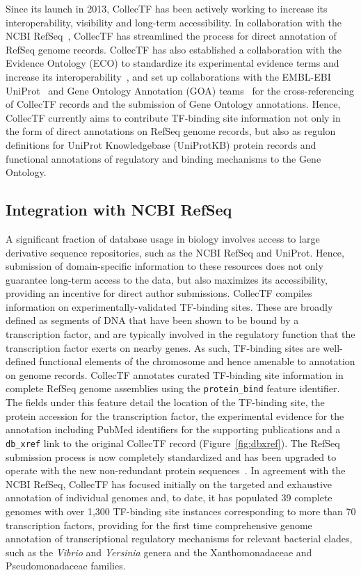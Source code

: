 Since its launch in 2013, CollecTF has been actively working to increase its
interoperability, visibility and long-term accessibility. In collaboration with
the NCBI RefSeq~\cite{pruitt2007ncbi}, CollecTF has streamlined the process for
direct annotation of RefSeq genome records. CollecTF has also established a
collaboration with the Evidence Ontology (ECO) to standardize its experimental
evidence terms and increase its
interoperability~\cite{chibucos2014standardized}, and set up collaborations
with the EMBL-EBI UniProt~\cite{uniprot2014uniprot} and Gene Ontology
Annotation (GOA) teams~\cite{ashburner2000gene} for the cross-referencing of
CollecTF records and the submission of Gene Ontology annotations. Hence,
CollecTF currently aims to contribute TF-binding site information not only in
the form of direct annotations on RefSeq genome records, but also as regulon
definitions for UniProt Knowledgebase (UniProtKB) protein records and
functional annotations of regulatory and binding mechanisms to the Gene
Ontology.


\subsection{Integration with NCBI RefSeq}

A significant fraction of database usage in biology involves access to large
derivative sequence repositories, such as the NCBI RefSeq and UniProt. Hence,
submission of domain-specific information to these resources does not only
guarantee long-term access to the data, but also maximizes its accessibility,
providing an incentive for direct author submissions. CollecTF compiles
information on experimentally-validated TF-binding sites. These are broadly
defined as segments of DNA that have been shown to be bound by a transcription
factor, and are typically involved in the regulatory function that the
transcription factor exerts on nearby genes. As such, TF-binding sites are
well-defined functional elements of the chromosome and hence amenable to
annotation on genome records. CollecTF annotates curated TF-binding site
information in complete RefSeq genome assemblies using the \verb|protein_bind|
feature identifier. The fields under this feature detail the location of the
TF-binding site, the protein accession for the transcription factor, the
experimental evidence for the annotation including PubMed identifiers for the
supporting publications and a \verb|db_xref| link to the original CollecTF
record (Figure~\ref{fig:dbxref}). The RefSeq submission process is now completely standardized
and has been upgraded to operate with the new non-redundant protein
sequences~\cite{o2015reference}. In agreement with the NCBI RefSeq, CollecTF
has focused initially on the targeted and exhaustive annotation of individual
genomes and, to date, it has populated 39 complete genomes with over 1,300
TF-binding site instances corresponding to more than 70 transcription factors,
providing for the first time comprehensive genome annotation of transcriptional
regulatory mechanisms for relevant bacterial clades, such as the
\textit{Vibrio} and \textit{Yersinia} genera and the Xanthomonadaceae and
Pseudomonadaceae families.

